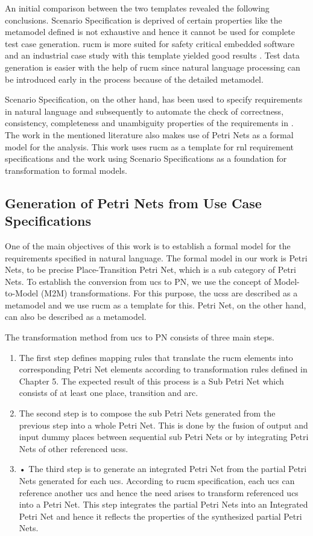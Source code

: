 An initial comparison between the two templates revealed the following conclusions. Scenario Specification is deprived of certain properties like the metamodel defined is not exhaustive and hence it cannot be used for complete test case generation. \gls{rucm} is more suited for safety critical embedded software and an industrial case study with this template yielded good results \cite{wang2015umtg}. Test data generation is easier with the help of \gls{rucm} since natural language processing can be introduced early in the process because of the detailed metamodel. 

Scenario Specification, on the other hand, has been used to specify requirements in natural language and subsequently to automate the check of correctness, consistency, completeness and unambiguity properties of the requirements in \cite{calisaya2016analysis}. The work in the mentioned literature also makes use of Petri Nets as a formal model for the analysis. This work uses \gls{rucm} as a template for \gls{rnl} requirement specifications and the work using Scenario Specifications as a foundation for transformation to formal models. 


\subsection{Generation of Petri Nets from Use Case Specifications}
One of the main objectives of this work is to establish a formal model for the requirements specified in natural language. The formal model in our work is Petri Nets, to be precise Place-Transition Petri Net, which is a sub category of Petri Nets. To establish the conversion from \gls{ucs} to PN, we use the concept of Model-to-Model (M2M) transformations. For this purpose, the \glspl{ucs} are described as a metamodel and we use \gls{rucm} as a template for this. Petri Net, on the other hand, can also be described as a metamodel.

The transformation method from \gls{ucs} to PN consists of three main steps.

\begin{enumerate}
\item The first step defines mapping rules that translate the \gls{rucm} elements into corresponding Petri Net elements according to transformation rules defined in Chapter 5. The expected result of this process is a Sub Petri Net which consists of at least one place, transition and arc.
\item The second step is to compose the sub Petri Nets generated from the previous step into a whole Petri Net. This is done by the fusion of output and input dummy places between sequential sub Petri Nets or by integrating Petri Nets of other referenced \glspl{ucs}.
\item •	The third step is to generate an integrated Petri Net from the partial Petri Nets generated for each \gls{ucs}. According to \gls{rucm} specification, each \gls{ucs} can reference another \gls{ucs} and hence the need arises to transform referenced \gls{ucs} into a Petri Net. This step integrates the partial Petri Nets into an Integrated Petri Net and hence it reflects the properties of the synthesized partial Petri Nets.
\end{enumerate}

